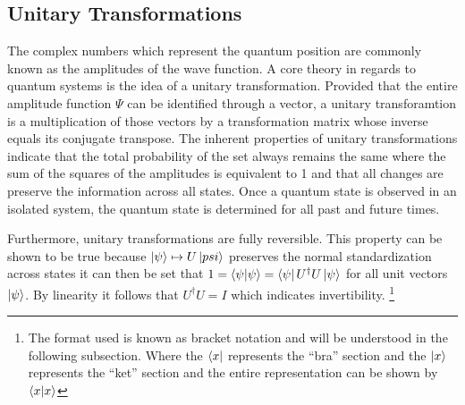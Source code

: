 \documentclass[12pt]{article}
\begin{document}
\subsection{Unitary Transformations}
The complex numbers which represent the quantum position are commonly known as the amplitudes of the wave function. A core theory in regards to quantum systems is the idea of a unitary transformation. Provided that the entire amplitude function $\Psi$ can be identified through a vector, a unitary transforamtion is a multiplication of those vectors by a transformation matrix whose inverse equals its conjugate transpose. \cite{cis4930}
The inherent properties of unitary transformations indicate that the total probability of the set always remains the same where the sum of the squares of the amplitudes is equivalent to 1 and that all changes are preserve the information across all states. Once a quantum state is observed in an isolated system, the quantum state is determined for all past and future times.\par
Furthermore, unitary transformations are fully reversible. This property can be shown to be true because $\ket{\psi} \mapsto U\ket{psi}$ preserves the normal standardization across states it can then be set that $1 = \bra{\psi}\ket{\psi} = \bra{\psi}U^ \dagger U\ket{\psi} $ for all unit vectors $\ket{\psi}$. By linearity it follows that $U^\dagger U = I$ which indicates invertibility. 
\footnote{The format used is known as bracket notation and will be understood in the following subsection. Where the $\bra{x}$ represents the ``bra'' section and the $\ket{x}$ represents the ``ket'' section and the entire representation can be shown by $\bra{x}\ket{x}$}
\end{document}
